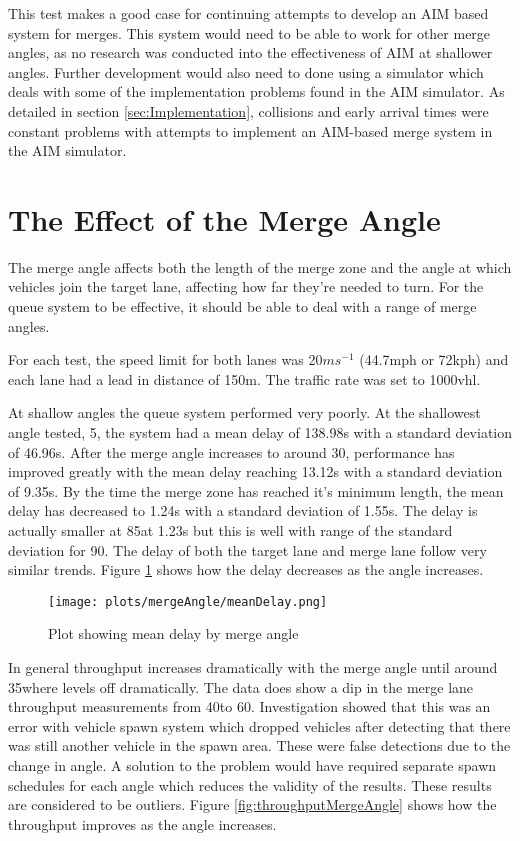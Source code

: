 This test makes a good case for continuing attempts to develop an AIM based system for merges. This system would need to be able to work for other merge angles, as no research was conducted into the effectiveness of AIM at shallower angles. Further development would also need to done using a simulator which deals with some of the implementation problems found in the AIM simulator. As detailed in section \ref{sec:Implementation}, collisions and early arrival times were constant problems with attempts to implement an AIM-based merge system in the AIM simulator.

\section{The Effect of the Merge Angle}
\label{sec:The Effect of the Merge Angle}
The merge angle affects both the length of the merge zone and the angle at which vehicles join the target lane, affecting how far they're needed to turn. For the queue system to be effective, it should be able to deal with a range of merge angles.

For each test, the speed limit for both lanes was 20$\si{ms^{-1}}$ (44.7\si{mph} or 72\si{kph}) and each lane had a lead in distance of 150\si{m}. The traffic rate was set to 1000\si{vhl}.

At shallow angles the queue system performed very poorly. At the shallowest angle tested, 5\degree, the system had a mean delay of 138.98\si{s} with a standard deviation of 46.96\si{s}. After the merge angle increases to around 30\degree, performance has improved greatly with the mean delay reaching 13.12\si{s} with a standard deviation of 9.35\si{s}. By the time the merge zone has reached it's minimum length, the mean delay has decreased to 1.24\si{s} with a standard deviation of 1.55\si{s}. The delay is actually smaller at 85\degree at 1.23\si{s} but this is well with range of the standard deviation for 90\degree. The delay of both the target lane and merge lane follow very similar trends. Figure \ref{fig:meanDelayMergeAngle} shows how the delay decreases as the angle increases.

\begin{figure}[htb]
\centering
\texttt{[image: plots/mergeAngle/meanDelay.png]}
\caption{Plot showing mean delay by merge angle}
\label{fig:meanDelayMergeAngle}
\end{figure}

In general throughput increases dramatically with the merge angle until around 35\degree where levels off dramatically. The data does show a dip in the merge lane throughput measurements from 40\degree to 60\degree. Investigation showed that this was an error with vehicle spawn system which dropped vehicles after detecting that there was still another vehicle in the spawn area. These were false detections due to the change in angle. A solution to the problem would have required separate spawn schedules for each angle which reduces the validity of the results. These results are considered to be outliers. Figure \ref{fig:throughputMergeAngle} shows how the throughput improves as the angle increases.

